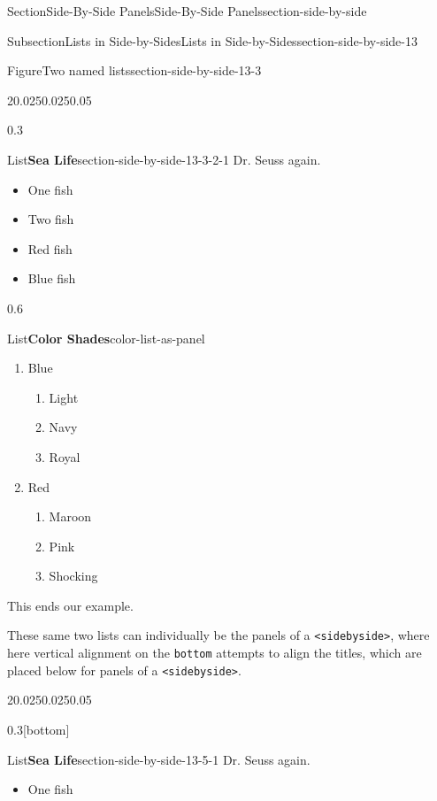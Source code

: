 \documentclass[twoside,10pt,]{article}
\newcommand{\mono}[1]{\texttt{#1}}
\numberwithin{equation}{section}
\begin{document}
\begin{sectionptx}{Section}{Side-By-Side Panels}{}{Side-By-Side Panels}{}{}{section-side-by-side}
\begin{subsectionptx}{Subsection}{Lists in Side-by-Sides}{}{Lists in Side-by-Sides}{}{}{section-side-by-side-13}
\begin{figureptx}{Figure}{Two named lists}{section-side-by-side-13-3}{}
\begin{sidebyside}{2}{0.025}{0.025}{0.05}
\begin{sbspanel}{0.3}
\begin{sublistptx}{List}{\textbf{Sea Life}}{section-side-by-side-13-3-2-1}{}
Dr. Seuss again.%
%
\begin{itemize}[label=\textbullet]
\item{}One fish%
\item{}Two fish\protect\footnotemark{}%
\item{}Red fish%
\item{}Blue fish%
\end{itemize}
\tcblower
\end{sublistptx}%
\end{sbspanel}%
\begin{sbspanel}{0.6}%
\begin{sublistptx}{List}{\textbf{Color Shades}}{color-list-as-panel}{}%
%
%
\begin{enumerate}
\item{}Blue\protect\footnotemark{}%
\begin{enumerate}
\item{}Light%
\item{}Navy%
\item{}Royal%
\end{enumerate}
%
\item{}Red%
\begin{enumerate}
\item{}Maroon%
\item{}Pink%
\item{}Shocking%
\end{enumerate}
%
\end{enumerate}
This ends our example.%
\tcblower
\end{sublistptx}%
\end{sbspanel}%
\end{sidebyside}%
\tcblower
\end{figureptx}%
%
%
These same two lists can individually be the panels of a \mono{<sidebyside>}, where here vertical alignment on the \mono{bottom} attempts to align the titles, which are placed below for panels of a \mono{<sidebyside>}.%
\begin{sidebyside}{2}{0.025}{0.025}{0.05}%
\begin{sbspanel}{0.3}[bottom]%
\begin{panellistptx}{List}{\textbf{Sea Life}}{section-side-by-side-13-5-1}{}%
Dr. Seuss again.%
%
\begin{itemize}[label=\textbullet]
\item{}One fish\protect\footnotemark{}%

\end{itemize}
\end{panellistptx}
\end{sbspanel}
\end{sidebyside}
\end{subsectionptx}
\end{sectionptx}
\end{document}
